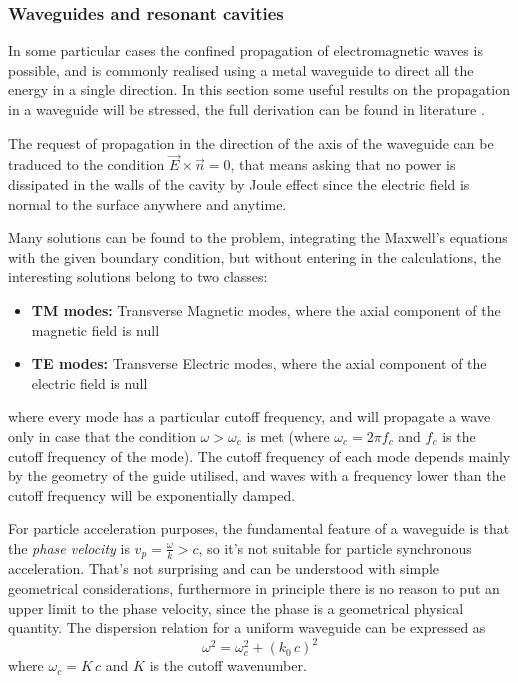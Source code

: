 \subsubsection[Waveguides and resonant cavities]{Waveguides and resonant cavities}

In some particular cases the confined propagation of electromagnetic waves is possible, and is commonly realised using a metal waveguide to direct all the energy in a single direction. In this section some useful results on the propagation in a waveguide will be stressed, the full derivation can be found in literature \cite{Botta:EM, Jackson:ClassEM,Weiss:261732}. 

The request of propagation in the direction of the axis of the waveguide can be traduced to the condition $\vec{E} \times \vec{n} = 0$, that means asking that no power is dissipated in the walls of the cavity by Joule effect since the electric field is normal to the surface anywhere and anytime.

Many solutions can be found to the problem, integrating the Maxwell's equations with the given boundary condition, but without entering in the calculations, the interesting solutions belong to two classes:
\begin{itemize}
\item \textbf{TM modes:} Transverse Magnetic modes, where the axial component of the magnetic field is null
\item \textbf{TE modes:} Transverse Electric modes, where the axial component of the electric field is null
\end{itemize}
where every mode has a particular cutoff frequency, and will propagate a wave only in case that the condition $\omega > \omega_c$ is met (where $\omega_c = 2\pi f_c$ and $f_c$ is the cutoff frequency of the mode). The cutoff frequency of each mode depends mainly by the geometry of the guide utilised, and waves with a frequency lower than the cutoff frequency will be exponentially damped.

For particle acceleration purposes, the fundamental feature of a waveguide is that the \textit{phase velocity} is $v_p = \frac{\omega}{k} > c$, so it's not suitable for particle synchronous acceleration. That's not surprising and can be understood with simple geometrical considerations\cite{Weiss:261732}, furthermore in principle there is no reason to put an upper limit to the phase velocity, since the phase is a geometrical physical quantity. The dispersion relation for a uniform waveguide can be expressed as 
\begin{equation}
\omega^2 = \omega^2_c + (k_0 \, c)^2
\end{equation}
where $\omega_c = K \, c$ and $K$ is the cutoff wavenumber.

